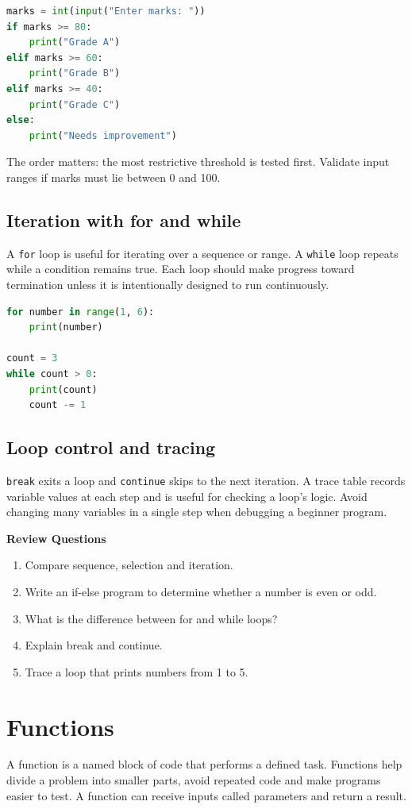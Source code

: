 \documentclass[11pt,openany,oneside]{book}
\newcommand{\reviewtitle}{\par\noindent\textbf{\color{Navy}Review Questions}\par}
\begin{document}
\begin{lstlisting}[style=webcode,language=Python]
marks = int(input("Enter marks: "))
if marks >= 80:
    print("Grade A")
elif marks >= 60:
    print("Grade B")
elif marks >= 40:
    print("Grade C")
else:
    print("Needs improvement")
\end{lstlisting}
The order matters: the most restrictive threshold is tested first. Validate input ranges if marks must lie between 0 and 100.

\section{Iteration with for and while}
A \texttt{for} loop is useful for iterating over a sequence or range. A \texttt{while} loop repeats while a condition remains true. Each loop should make progress toward termination unless it is intentionally designed to run continuously.

\begin{lstlisting}[style=webcode,language=Python]
for number in range(1, 6):
    print(number)

count = 3
while count > 0:
    print(count)
    count -= 1
\end{lstlisting}

\section{Loop control and tracing}
\texttt{break} exits a loop and \texttt{continue} skips to the next iteration. A trace table records variable values at each step and is useful for checking a loop's logic. Avoid changing many variables in a single step when debugging a beginner program.

\reviewtitle
\begin{enumerate}
\item Compare sequence, selection and iteration.
\item Write an if-else program to determine whether a number is even or odd.
\item What is the difference between for and while loops?
\item Explain break and continue.
\item Trace a loop that prints numbers from 1 to 5.
\end{enumerate}

\chapter{Functions}
A function is a named block of code that performs a defined task. Functions help divide a problem into smaller parts, avoid repeated code and make programs easier to test. A function can receive inputs called parameters and return a result.
\end{document}

